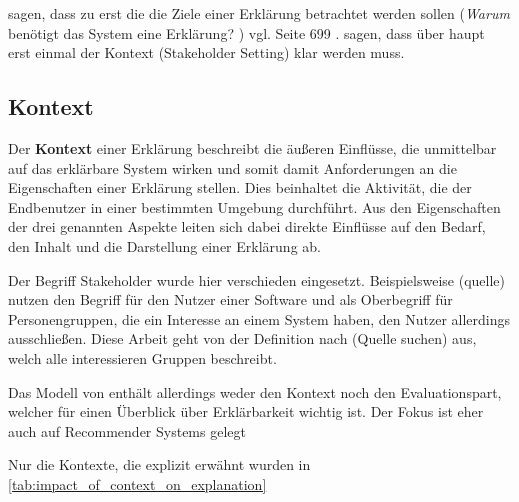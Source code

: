 \cite{rosenfeld_explainability_2019} sagen, dass zu erst die die Ziele einer Erklärung betrachtet werden sollen (\glqq \textit{Warum} benötigt das System eine Erklärung? \grqq{}) vgl. Seite 699 \cite{rosenfeld_explainability_2019}. \cite{cirqueira_scenario-based_2020} sagen, dass über haupt erst einmal der Kontext (\glqq Stakeholder Setting\grqq{}) klar werden muss.

\subsection{Kontext}

Der \textbf{Kontext} einer Erklärung beschreibt die äußeren Einflüsse, die unmittelbar auf das erklärbare System wirken und somit damit Anforderungen an die Eigenschaften einer Erklärung stellen. Dies beinhaltet die Aktivität, die der Endbenutzer in einer bestimmten Umgebung durchführt. Aus den Eigenschaften der drei genannten Aspekte leiten sich dabei direkte Einflüsse auf den Bedarf, den Inhalt und die Darstellung einer Erklärung ab.

Der Begriff Stakeholder wurde hier verschieden eingesetzt. Beispielsweise (quelle) nutzen den Begriff für den Nutzer einer Software und \cite{nunes_systematic_2017} als Oberbegriff für Personengruppen, die ein Interesse an einem System haben, den Nutzer allerdings ausschließen. Diese Arbeit geht von der Definition nach (Quelle suchen) aus, welch alle interessieren Gruppen beschreibt. 

Das Modell von \cite{nunes_systematic_2017} enthält allerdings weder den Kontext noch den Evaluationspart, welcher für einen Überblick über Erklärbarkeit wichtig ist. Der Fokus ist eher auch auf Recommender Systems gelegt

Nur die Kontexte, die explizit erwähnt wurden in \autoref{tab:impact_of_context_on_explanation}

